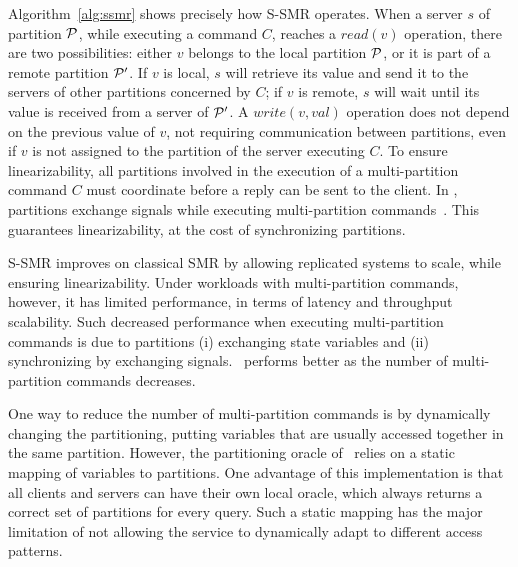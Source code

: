 Algorithm~\ref{alg:ssmr} shows precisely how S-SMR operates. When a server $s$ of partition $\mathcal{P}$, while executing a command $C$, reaches a $read(v)$ operation, there are two possibilities:
either $v$ belongs to the local partition $\mathcal{P}$,
or it is part of a remote partition $\mathcal{P}'$. 
If $v$ is local, $s$ will retrieve its value and send it to the servers of other partitions concerned by $C$;
if $v$ is remote, $s$ will wait until its value is received from a server of $\mathcal{P}'$. 
A $write(v, val)$ operation does not depend on the previous value of $v$, not requiring communication between partitions, even if $v$ is not assigned to the partition of the server executing $C$.
To ensure linearizability, all partitions involved in the execution of a multi-partition command $C$ must coordinate before a reply can be sent to the client.
In \ssmr{}, partitions exchange signals while executing multi-partition commands~\cite{bezerra2014ssmr}.
This guarantees linearizability, at the cost of synchronizing partitions.



S-SMR improves on classical SMR by allowing replicated systems to scale, while ensuring linearizability. 
Under workloads with multi-partition commands, however, it has limited performance, in terms of latency and throughput scalability. 
Such decreased performance when executing multi-partition commands is due to
partitions (i) exchanging state variables
and (ii) synchronizing by exchanging signals.
\ssmr\ performs better as the number of multi-partition commands decreases.

One way to reduce the number of multi-partition commands is by dynamically changing the partitioning, putting variables that are usually accessed together in the same partition.
However, the partitioning oracle of \ssmr\ relies on a static mapping of variables to partitions.
One advantage of this implementation is that all clients and servers can have their own local oracle, which always returns a correct set of partitions for every query.
Such a static mapping has the major limitation of not allowing the service to dynamically adapt to different access patterns.

